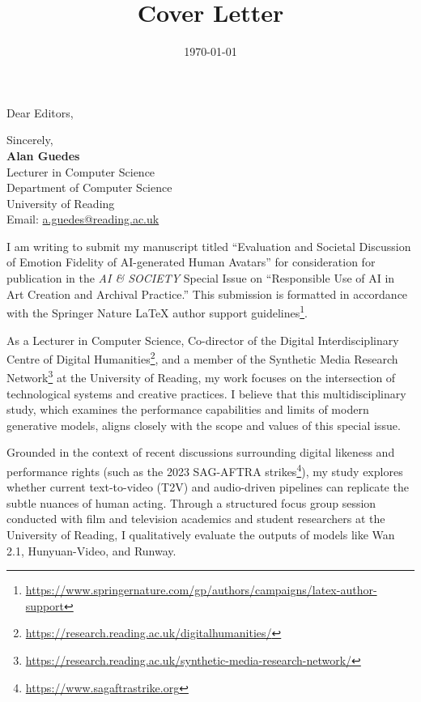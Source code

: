 \documentclass[10pt,a4paper,sans,colorlinks]{moderncv}
\newcommand\setHyperrefBlueLinks{
    \definecolor{links}{HTML}{2A1B81}
    \hypersetup{
        urlcolor=links,
        linkcolor=links,
        citecolor=links
    }
}
\begin{document}
\title{Cover Letter}
\setHyperrefBlueLinks
{}
\opening{Dear Editors,}
\date{\today}

\makeatletter
\renewcommand*{\makeletterclosing}{%
  \par\addvspace{2.5em}%
  {\bfseries\@closing}%
  \par}
\makeatother

\closing{Sincerely,\\
\vspace{1.5em}
\textbf{Alan Guedes}\\
Lecturer in Computer Science\\
Department of Computer Science\\
University of Reading\\
Email: \url{a.guedes@reading.ac.uk}}

\makelettertitle
\justify

I am writing to submit my manuscript titled ``Evaluation and Societal Discussion of Emotion Fidelity of AI-generated Human Avatars'' for consideration for publication in the \textit{AI \& SOCIETY} Special Issue on ``Responsible Use of AI in Art Creation and Archival Practice.'' This submission is formatted in accordance with the Springer Nature LaTeX author support guidelines\footnote{\url{https://www.springernature.com/gp/authors/campaigns/latex-author-support}}. 

As a Lecturer in Computer Science, Co-director of the Digital Interdisciplinary Centre of Digital Humanities\footnote{\url{https://research.reading.ac.uk/digitalhumanities/}}, and a member of the Synthetic Media Research Network\footnote{\url{https://research.reading.ac.uk/synthetic-media-research-network/}} at the University of Reading, my work focuses on the intersection of technological systems and creative practices. I believe that this multidisciplinary study, which examines the performance capabilities and limits of modern generative models, aligns closely with the scope and values of this special issue.

Grounded in the context of recent discussions surrounding digital likeness and performance rights (such as the 2023 SAG-AFTRA strikes\footnote{\url{https://www.sagaftrastrike.org}}), my study explores whether current text-to-video (T2V) and audio-driven pipelines can replicate the subtle nuances of human acting. Through a structured focus group session conducted with film and television academics and student researchers at the University of Reading, I qualitatively evaluate the outputs of models like Wan 2.1, Hunyuan-Video, and Runway.
\end{document}
